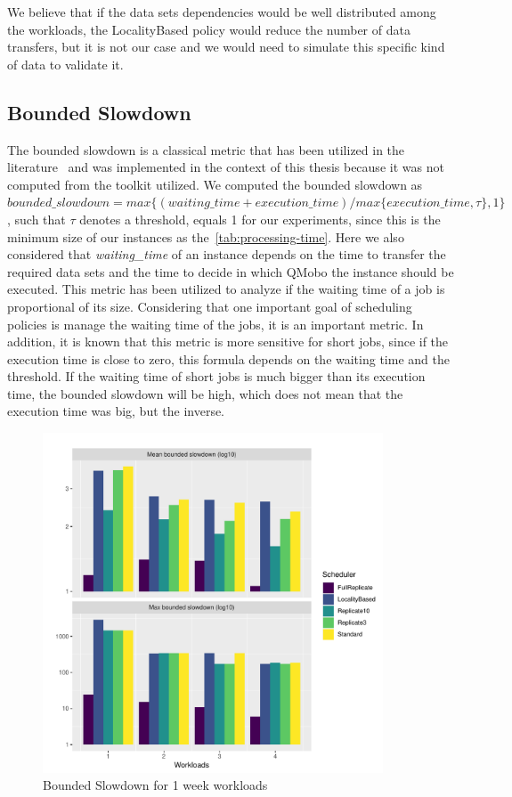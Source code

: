 We believe that if the data sets dependencies would be well distributed among the workloads, the LocalityBased policy would reduce the number of data transfers, but it is not our case and we would need to simulate this specific kind of data to validate it.

\subsection{Bounded Slowdown}

The bounded slowdown is a classical metric that has been utilized in the literature~\cite{job_metrics} and was implemented in the context of this thesis because it was not computed from the toolkit utilized. We computed the bounded slowdown as $bounded\_slowdown = max \{(waiting\_time + execution\_time) / max\{execution\_time, \tau\} , 1\}$ , such that $\tau$ denotes a threshold, equals 1 for our experiments, since this is the minimum size of our instances as the~\cref{tab:processing-time}.
Here we also considered that \textit{waiting\_time} of an instance depends on the time to transfer the required data sets and the time to decide in which QMobo the instance should be executed. 
This metric has been utilized to analyze if the waiting time of a job is proportional of its size. Considering that one important goal of scheduling policies is manage the waiting time of the jobs, it is an important metric.
In addition, it is known that this metric is more sensitive for short jobs, since if the execution time is close to zero, this formula depends on the waiting time and the threshold. If the waiting time of short jobs is much bigger than its execution time, the bounded slowdown will be high, which does not mean that the execution time was big, but the inverse.

\begin{figure}
    \centering
    \includegraphics[width=0.9\textwidth]{images/experiments/metrics/full_metrics_slowdown.pdf}
    \caption{Bounded Slowdown for 1 week workloads}
    \label{fig:full-bounded-slowdown}
\end{figure}

